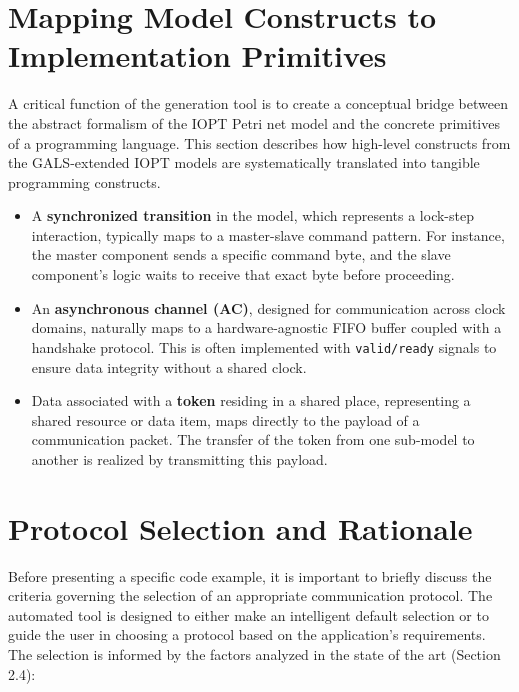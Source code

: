 \section{Mapping Model Constructs to Implementation Primitives}
\label{sec:mapping_constructs}

A critical function of the generation tool is to create a conceptual bridge between the abstract formalism of the IOPT Petri net model and the concrete primitives of a programming language. This section describes how high-level constructs from the GALS-extended IOPT models are systematically translated into tangible programming constructs.

\begin{itemize}
    \item A \textbf{synchronized transition} in the model, which represents a lock-step interaction, typically maps to a master-slave command pattern. For instance, the master component sends a specific command byte, and the slave component's logic waits to receive that exact byte before proceeding.
    \item An \textbf{asynchronous channel (AC)}, designed for communication across clock domains, naturally maps to a hardware-agnostic FIFO buffer coupled with a handshake protocol. This is often implemented with \texttt{valid/ready} signals to ensure data integrity without a shared clock.
    \item Data associated with a \textbf{token} residing in a shared place, representing a shared resource or data item, maps directly to the payload of a communication packet. The transfer of the token from one sub-model to another is realized by transmitting this payload.
\end{itemize}

\section{Protocol Selection and Rationale}
\label{sec:protocol_rationale}

Before presenting a specific code example, it is important to briefly discuss the criteria governing the selection of an appropriate communication protocol. The automated tool is designed to either make an intelligent default selection or to guide the user in choosing a protocol based on the application's requirements. The selection is informed by the factors analyzed in the state of the art (Section 2.4):

